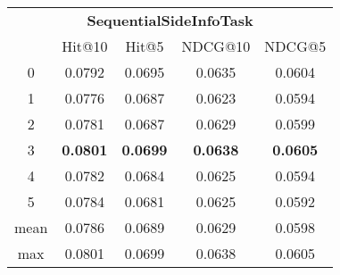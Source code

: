 \documentclass{article}
\begin{document}
 

\begin{tabular}{c|cccc}

\multicolumn{5}{c}{\textbf{SequentialSideInfoTask}} \\
\noalign{\smallskip}
\noalign{\smallskip}
\toprule
\multicolumn{1}{c}{Template ID} & \multicolumn{1}{|c}{Hit@10} & \multicolumn{1}{c}{Hit@5} & \multicolumn{1}{c}{NDCG@10} & \multicolumn{1}{c}{NDCG@5} \\
\midrule
0 & 0.0792 & 0.0695 & 0.0635 & 0.0604 \\
1 & 0.0776 & 0.0687 & 0.0623 & 0.0594 \\
2 & 0.0781 & 0.0687 & 0.0629 & 0.0599 \\
3 & \textbf{0.0801} & \textbf{0.0699} & \textbf{0.0638} & \textbf{0.0605} \\
4 & 0.0782 & 0.0684 & 0.0625 & 0.0594 \\
5 & 0.0784 & 0.0681 & 0.0625 & 0.0592 \\
\midrule
mean & 0.0786 & 0.0689 & 0.0629 & 0.0598 \\
max & 0.0801 & 0.0699 & 0.0638 & 0.0605 \\
\bottomrule

\end{tabular}
\end{document}
